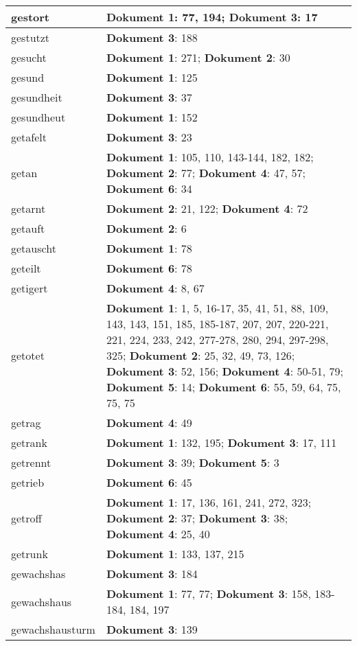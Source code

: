 \documentclass[a5paper]{article}
\begin{document}
\begin{longtable}[l]{|l|p{3in}|}
\hline
gestort & \textbf{Dokument 1}: 77, 194; \textbf{Dokument 3}: 17 \\
\hline
gestutzt & \textbf{Dokument 3}: 188 \\
\hline
gesucht & \textbf{Dokument 1}: 271; \textbf{Dokument 2}: 30 \\
\hline
gesund & \textbf{Dokument 1}: 125 \\
\hline
gesundheit & \textbf{Dokument 3}: 37 \\
\hline
gesundheut & \textbf{Dokument 1}: 152 \\
\hline
getafelt & \textbf{Dokument 3}: 23 \\
\hline
getan & \textbf{Dokument 1}: 105, 110, 143-144, 182, 182; \textbf{Dokument 2}: 77; \textbf{Dokument 4}: 47, 57; \textbf{Dokument 6}: 34 \\
\hline
getarnt & \textbf{Dokument 2}: 21, 122; \textbf{Dokument 4}: 72 \\
\hline
getauft & \textbf{Dokument 2}: 6 \\
\hline
getauscht & \textbf{Dokument 1}: 78 \\
\hline
geteilt & \textbf{Dokument 6}: 78 \\
\hline
getigert & \textbf{Dokument 4}: 8, 67 \\
\hline
getotet & \textbf{Dokument 1}: 1, 5, 16-17, 35, 41, 51, 88, 109, 143, 143, 151, 185, 185-187, 207, 207, 220-221, 221, 224, 233, 242, 277-278, 280, 294, 297-298, 325; \textbf{Dokument 2}: 25, 32, 49, 73, 126; \textbf{Dokument 3}: 52, 156; \textbf{Dokument 4}: 50-51, 79; \textbf{Dokument 5}: 14; \textbf{Dokument 6}: 55, 59, 64, 75, 75, 75 \\
\hline
getrag & \textbf{Dokument 4}: 49 \\
\hline
getrank & \textbf{Dokument 1}: 132, 195; \textbf{Dokument 3}: 17, 111 \\
\hline
getrennt & \textbf{Dokument 3}: 39; \textbf{Dokument 5}: 3 \\
\hline
getrieb & \textbf{Dokument 6}: 45 \\
\hline
getroff & \textbf{Dokument 1}: 17, 136, 161, 241, 272, 323; \textbf{Dokument 2}: 37; \textbf{Dokument 3}: 38; \textbf{Dokument 4}: 25, 40 \\
\hline
getrunk & \textbf{Dokument 1}: 133, 137, 215 \\
\hline
gewachshas & \textbf{Dokument 3}: 184 \\
\hline
gewachshaus & \textbf{Dokument 1}: 77, 77; \textbf{Dokument 3}: 158, 183-184, 184, 197 \\
\hline
gewachshausturm & \textbf{Dokument 3}: 139 \\

\end{longtable}
\end{document}
